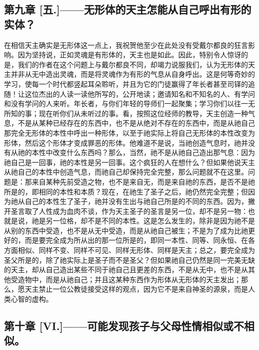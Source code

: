 
\subsection{第九章 [五.]——无形体的天主怎能从自己呼出有形的实体？}

在相信天主确实是无形体这一点上，我祝贺他至少在此处没有受戴尔都良的狂言影响。因为坚持说，正如灵魂是有形体的，天主也是如此。因此，特别令人惊讶的是，我们的作者在这个问题上与戴尔都良不同，却竭力说服我们，认为无形体的天主并非从无中造出灵魂，而是将灵魂作为有形的气息从自身呼出。这是何等奇妙的学习，使每一个时代都竖起耳朵聆听，并且为它的门徒赢得了年长者甚至司铎的追随！让这位杰出的人读一读他所写的，公开地读；邀请知名和不知名的人、有学问和没有学问的人来听。年长者，与你们年轻的导师们一起聚集；学习你们以往一无所知的事；现在听你们从未听过的事。看，按照这位经师的教导，天主创造一种气息，不是从某种已经存在的东西中，也不是从绝对不存在的东西中，而是从祂自己那完全无形体的本性中呼出一种形体，以至于祂实际上将自己无形体的本性改变为形体，然后这个形体才变成罪恶的形体。他难道不是说，当祂创造气息时，祂并没有从祂的本性中改变什么东西吗？那么，当然，祂不是从祂自己造出那气息：因为祂自己是一回事，祂的本性是另一回事。这个疯狂的人在想什么？但如果他说天主从祂自己的本性中创造气息，而祂自己却保持完全完整，那么问题就不在这里。问题是：那来自某种先前受造之物，也不是来自无，而是来自祂的东西，是否不是祂所是的，即相同的本性和本质？现在，在祂生了圣子之后，祂仍然完全完整；但因为祂从自己的本性生了圣子，祂并没有生出与祂自己所是的不同的东西。因为，撇开圣言取了人性成为血肉不谈，作为天主圣子的圣言是另一位，却不是另一物：也就是说，祂是另一位格，却不是不同的本性。这是怎么发生的，除非是因为祂不是从别的东西中受造，也不是从无中受造，而是从祂自己被生；不是为了成为比祂更好的，而是要完全成为所从出的那一位所是的，即同一本性、同等、同永恒、在各方面相似、同样不变、同样不可见、同样无形体、同样是天主；总之，要完全成为圣父所是的，除了祂实际上是圣子而不是圣父？但如果祂自己仍然是同一完美无缺的天主，却从自己造出某些不同于祂自己且更差的东西，不是从无中，也不是从其他受造物中，而是从祂自己；并且这某种东西作为形体从无形体的天主发出；那么，愿天主禁止一位公教徒接受这样的观点，因为它不是来自神圣的源泉，而是人类心智的虚构。\par


\subsection{第十章 [VI.]——可能发现孩子与父母性情相似或不相似。}

